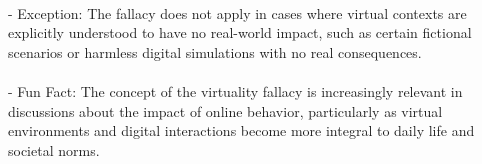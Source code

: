 \documentclass[a4paper,12pt,single,pdftex]{scrbook}
\begin{document}
    \\

    
      - Exception: The fallacy does not apply in cases where virtual contexts are explicitly understood to have no real-world impact, such as certain fictional scenarios or harmless digital simulations with no real consequences.
    \\

    
      
    \\

    
      - Fun Fact: The concept of the virtuality fallacy is increasingly relevant in discussions about the impact of online behavior, particularly as virtual environments and digital interactions become more integral to daily life and societal norms.
    \\
\end{document}
